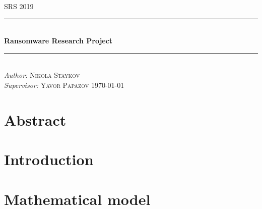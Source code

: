 \documentclass[11pt, a4paper]{article}
\begin{document}
\begin{titlepage}
	\newcommand{\HRule}{\rule{\linewidth}{0.5mm}}
	\centering
	\textsc{\LARGE SRS 2019}\\[1cm]
	\HRule\\[1 cm]
	
	{\huge\bfseries Ransomware Research Project }\\[0.5 cm] 
	\HRule\\
    \vfill
			\Large
			\textit{Author:}
			 \textsc{Nikola Staykov}\\
             \vspace{2cm}
			\Large
			\textit{Supervisor:}
            \textsc{Yavor Papazov}
    \vfill	
	{\large\today}   
	\vfill
\end{titlepage}

\tableofcontents
\newpage
\section*{Abstract}

\section{Introduction}

\section{Mathematical model}
\end{document}
